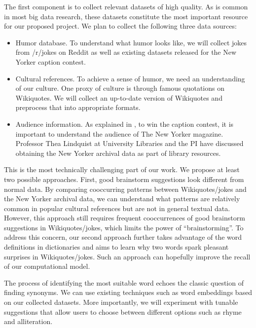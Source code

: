 The first component is to collect relevant datasets of high quality.
As is common in most big data research,
these datasets constitute the most important resource for our proposed project.
We plan to collect the following three data sources:
\begin{itemize}[leftmargin=*,noitemsep,topsep=0pt,parsep=0pt,partopsep=0pt]
  \item Humor database. To understand what humor looks like, we will collect jokes from /r/jokes on Reddit as well as existing datasets released for the New Yorker caption contest.
  \item Cultural references. To achieve a sense of humor, we need an understanding of our culture. One proxy of culture is through famous quotations on Wikiquotes. We will collect an up-to-date version of Wikiquotes and preprocess that into appropriate formats.
  \item Audience information. As explained in \citet{house_slate}, to win the caption contest, it is important to understand the audience of The New Yorker magazine. Professor Thea Lindquist at University Libraries and the PI have discussed obtaining the New Yorker archival data as part of library resources.
\end{itemize}




This is the most technically challenging part of our work.
We propose at least two possible approaches.
First, good brainstorm suggestions look different from normal data.
By comparing cooccurring patterns between Wikiquotes/jokes and the New Yorker archival data, we can understand what patterns are relatively common in popular cultural references but are not in general textual data.
However, this approach still requires frequent cooccurrences of good brainstorm suggestions in Wikiquotes/jokes, which limits the power of ``brainstorming''.
To address this concern, our second approach further takes advantage of the word definitions in dictionaries and aims to learn why two words spark pleasant surprises in Wikiquotes/jokes.
Such an approach can hopefully improve the recall of our computational model.

 The process of identifying the most suitable word echoes the classic question of finding synonyms.
We can use existing techniques such as word embeddings based on our collected datasets.
More importantly, we will experiment with tunable suggestions that allow users to choose between different options such as rhyme and alliteration.

